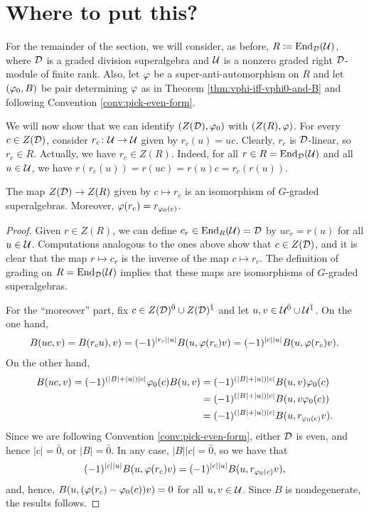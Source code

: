 \section{Where to put this?}

For the remainder of the section, we will consider, as before, $R \coloneqq \operatorname{End}_{\mathcal{D}}(\mathcal U)$, where $\mathcal{D}$ is a graded division superalgebra and $\mathcal U$ is a nonzero graded right $\mathcal{D}$-module of finite rank.
Also, let $\varphi$ be a super-anti-automorphism on $R$ and let $(\varphi_0, B)$ be pair determining $\varphi$ as in Theorem \ref{thm:vphi-iff-vphi0-and-B} and following Convention \ref{conv:pick-even-form}.

We will now show that we can identify $(Z(\mathcal{D}), \varphi_0)$ with $(Z(R), \varphi)$.
For every $c\in Z(\mathcal{D})$, consider $r_c\colon \mathcal U \to \mathcal U$ given by $r_c(u) = uc$.
Clearly, $r_c$ is $\mathcal{D}$-linear, so $r_c \in R$.
Actually, we have $r_c\in Z(R)$.
Indeed, for all $r\in R = \operatorname{End}_{\mathcal{D}}(\mathcal U)$ and all $u\in \mathcal U$, we have $r (r_c(u)) = r(uc) = r(u) c = r_c(r(u))$.

\begin{prop}%
	The map $Z(\mathcal{D}) \to Z(R)$ given by $c \mapsto r_c$ is an isomorphism of $G$-graded superalgebras.
	Moreover, $\varphi (r_c) = r_{\varphi_0(c)}$.
\end{prop}

\begin{proof}
	Given $r\in Z(R)$, we can define $c_r\in \operatorname{End}_R (\mathcal U) =\mathcal{D}$ by $uc_r = r(u)$ for all $u\in \mathcal U$.
	Computations analogous to the ones above show that $c\in Z(\mathcal{D})$, and it is clear that the map $r\mapsto c_r$ is the inverse of the map $c \mapsto r_c$.
	The definition of grading on $R = \operatorname{End}_{\mathcal{D}} (\mathcal U)$ implies that these maps are isomorphisms of $G$-graded superalgebras.

	For the ``moreover'' part, fix $c\in Z(\mathcal{D})^{\bar0} \cup Z(\mathcal{D})^{\bar1}$ and let $u, v \in \mathcal U^{\bar0} \cup \mathcal U^{\bar1}$.
	On the one hand,
	\begin{align*}
		B(uc,v) = B(r_c u), v) = (-1)^{|r_c||u|} B(u, \varphi(r_c) v) = (-1)^{|c||u|} B(u, \varphi(r_c) v).
	\end{align*}
	On the other hand,
	\begin{align*}
		B(uc, v) = (-1)^{(|B| + |u|) |c|} \varphi_0(c) B(u, v) & = (-1)^{(|B| + |u|) |c|} B(u, v) \varphi_0(c)     \\
		                                                     & = (-1)^{(|B| + |u|) |c|} B(u, v \varphi_0(c) )    \\
		                                                     & = (-1)^{(|B| + |u|) |c|} B(u, r_{\varphi_0(c)}v).
	\end{align*}
	Since we are following Convention \ref{conv:pick-even-form}, either $\mathcal{D}$ is even, and hence $|c| = \bar 0$, or
	$|B| = \bar 0$.
	In any case, $|B||c| = \bar 0$, so we have that \[(-1)^{|c||u|} B(u, \varphi(r_c) v) = (-1)^{|c||u|} B(u, r_{\varphi_0(c)}v),\] and, hence, $B(u, (\varphi(r_c) - \varphi_0(c)) v) = 0$ for all $u, v \in \mathcal U$.
	Since $B$ is nondegenerate, the results follows.
\end{proof}


